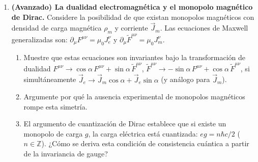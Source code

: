 \begin{enumerate}[leftmargin=2em, label=\textbf{P\thechapter.\arabic*.}]
  \item \textbf{(Avanzado) La dualidad electromagnética y el monopolo magnético de Dirac.}
  Considere la posibilidad de que existan monopolos magnéticos con densidad de carga magnética $\rho_m$ y corriente $\vec{J}_m$. Las ecuaciones de Maxwell generalizadas son:
  $\partial_\mu F^{\mu\nu} = \mu_0 J^\nu_e$ y $\partial_\mu \tilde{F}^{\mu\nu} = \mu_0 J^\nu_m$.
  \begin{enumerate}[label=(\alph*)]
    \item Muestre que estas ecuaciones son invariantes bajo la transformación de dualidad
    $F^{\mu\nu} \to \cos\alpha\, F^{\mu\nu} + \sin\alpha\, \tilde{F}^{\mu\nu}$,
    $\tilde{F}^{\mu\nu} \to -\sin\alpha\, F^{\mu\nu} + \cos\alpha\, \tilde{F}^{\mu\nu}$,
    si simultáneamente $\vec{J}_e \to \vec{J}_m\cos\alpha + \vec{J}_e\sin\alpha$ (y análogo para $\vec{J}_m$).
    \item Argumente por qué la ausencia experimental de monopolos magnéticos rompe esta simetría.
    \item El argumento de cuantización de Dirac establece que si existe un monopolo de carga $g$, la carga eléctrica está cuantizada: $eg = n\hbar c/2$ ($n \in \mathbb{Z}$). ¿Cómo se deriva esta condición de consistencia cuántica a partir de la invariancia de gauge?
  \end{enumerate}

\end{enumerate}
